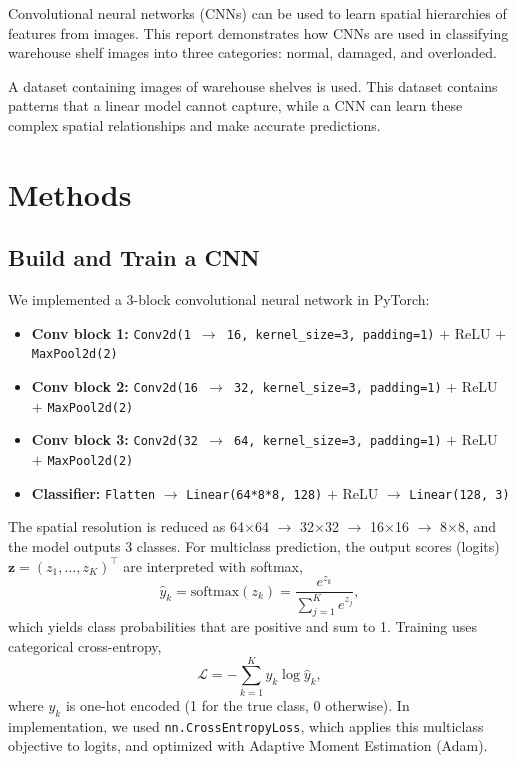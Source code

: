 \documentclass[10pt,twocolumn]{article}
\begin{document}
Convolutional neural networks (CNNs) can be used to learn spatial hierarchies of features from images. This report demonstrates how CNNs are used in classifying warehouse shelf images into three categories: normal, damaged, and overloaded.

A dataset containing images of warehouse shelves is used. This dataset contains patterns that a linear model cannot capture, while a CNN can learn these complex spatial relationships and make accurate predictions.

\section{Methods}

\subsection{Build and Train a CNN}
We implemented a 3-block convolutional neural network in PyTorch:

\begin{itemize}
	\item \textbf{Conv block 1:} \texttt{Conv2d(1\,$\rightarrow$\,16, kernel\_size=3, padding=1)} $+$ ReLU $+$ \texttt{MaxPool2d(2)}
	\item \textbf{Conv block 2:} \texttt{Conv2d(16\,$\rightarrow$\,32, kernel\_size=3, padding=1)} $+$ ReLU $+$ \texttt{MaxPool2d(2)}
	\item \textbf{Conv block 3:} \texttt{Conv2d(32\,$\rightarrow$\,64, kernel\_size=3, padding=1)} $+$ ReLU $+$ \texttt{MaxPool2d(2)}
	\item \textbf{Classifier:} \texttt{Flatten} $\rightarrow$ \texttt{Linear(64*8*8, 128)} $+$ ReLU $\rightarrow$ \texttt{Linear(128, 3)}
\end{itemize}

The spatial resolution is reduced as 64$\times$64 $\rightarrow$ 32$\times$32 $\rightarrow$ 16$\times$16 $\rightarrow$ 8$\times$8, and the model outputs 3 classes. For multiclass prediction, the output scores (logits) $\mathbf{z}=(z_1,\ldots,z_K)^\top$ are interpreted with softmax,
\[
\hat{y}_k = \mathrm{softmax}(z_k) = \frac{e^{z_k}}{\sum_{j=1}^{K} e^{z_j}},
\]
which yields class probabilities that are positive and sum to 1. Training uses categorical cross-entropy,
\[
\mathcal{L} = -\sum_{k=1}^{K} y_k \log \hat{y}_k,
\]
where $y_k$ is one-hot encoded (1 for the true class, 0 otherwise). In implementation, we used \texttt{nn.CrossEntropyLoss}, which applies this multiclass objective to logits, and optimized with Adaptive Moment Estimation (Adam).
\end{document}

